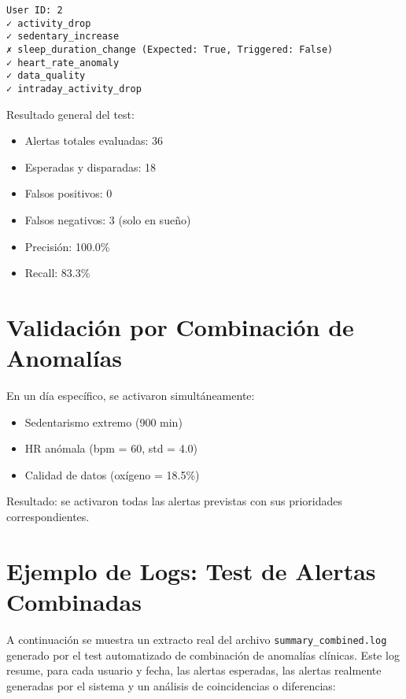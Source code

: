 \begin{verbatim}
User ID: 2
✓ activity_drop
✓ sedentary_increase
✗ sleep_duration_change (Expected: True, Triggered: False)
✓ heart_rate_anomaly
✓ data_quality
✓ intraday_activity_drop
\end{verbatim}

\noindent Resultado general del test:

\begin{itemize}
    \item Alertas totales evaluadas: 36
    \item Esperadas y disparadas: 18
    \item Falsos positivos: 0
    \item Falsos negativos: 3 (solo en sueño)
    \item Precisión: 100.0\%
    \item Recall: 83.3\%
\end{itemize}

\section{Validación por Combinación de Anomalías}
\label{anexo:pruebas:combinadas}

En un día específico, se activaron simultáneamente:

\begin{itemize}
    \item Sedentarismo extremo (900 min)
    \item HR anómala (bpm = 60, std = 4.0)
    \item Calidad de datos (oxígeno = 18.5\%)
\end{itemize}

\noindent Resultado: se activaron todas las alertas previstas con sus prioridades correspondientes.

\section{Ejemplo de Logs: Test de Alertas Combinadas}
\label{anexo:pruebas:logs_combinadas}

A continuación se muestra un extracto real del archivo \texttt{summary\_combined.log} generado por el test automatizado de combinación de anomalías clínicas. Este log resume, para cada usuario y fecha, las alertas esperadas, las alertas realmente generadas por el sistema y un análisis de coincidencias o diferencias:

